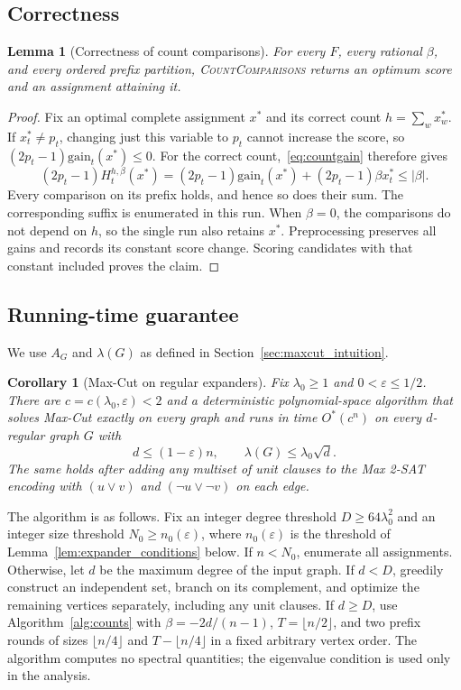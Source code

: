 \documentclass[11pt,a4paper]{article}
\newtheorem{lemma}[theorem]{Lemma}
\newtheorem{corollary}[theorem]{Corollary}
\theoremstyle{definition}
\theoremstyle{remark}
\newcommand{\Ostar}{O^{*}}
\begin{document}
\subsection{Correctness}

\begin{lemma}[Correctness of count comparisons]\label{lem:count_correctness}
For every $F$, every rational $\beta$, and every ordered prefix partition,
\textnormal{\textsc{CountComparisons}} returns an optimum score and an
assignment attaining it.
\end{lemma}
\begin{proof}
Fix an optimal complete assignment $x^*$ and its correct count
$h=\sum_wx_w^*$. If $x_t^*\ne p_t$, changing just this variable to $p_t$
cannot increase the score, so
$(2p_t-1)\mathrm{gain}_t(x^*)\le0$.
For the correct count,~\eqref{eq:countgain} therefore gives
\[
 (2p_t-1)H_t^{h,\beta}(x^*)
 =(2p_t-1)\mathrm{gain}_t(x^*)+(2p_t-1)\beta x_t^*
 \le|\beta|.
\]
Every comparison on its prefix holds, and hence so does their sum.
The corresponding suffix is enumerated in this run.
When $\beta=0$, the comparisons do not depend on $h$, so the single run
also retains $x^*$. Preprocessing preserves all gains and records its
constant score change. Scoring candidates with that constant included
proves the claim.
\end{proof}

\subsection{Running-time guarantee}\label{sec:maxcut_result}

We use $A_G$ and $\lambda(G)$ as defined in Section~\ref{sec:maxcut_intuition}.

\begin{corollary}[Max-Cut on regular expanders]\label{cor:maxcut}
Fix $\lambda_0\ge1$ and $0<\varepsilon\le1/2$. There are
$c=c(\lambda_0,\varepsilon)<2$ and a deterministic polynomial-space
algorithm that solves Max-Cut exactly on every graph and runs in time
$\Ostar(c^n)$ on every $d$-regular graph $G$ with
\[
 d\le(1-\varepsilon)n,\qquad \lambda(G)\le\lambda_0\sqrt d.
\]
The same holds after adding any multiset of unit clauses to the Max 2-SAT
encoding with $(u\lor v)$ and $(\neg u\lor\neg v)$ on each edge.
\end{corollary}

The algorithm is as follows. Fix an integer degree threshold
$D\ge64\lambda_0^2$ and an integer size threshold $N_0\ge n_0(\varepsilon)$,
where $n_0(\varepsilon)$ is the threshold of
Lemma~\ref{lem:expander_conditions} below. If $n<N_0$, enumerate all
assignments. Otherwise, let $d$ be the maximum degree of the input graph.
If $d<D$, greedily construct an independent set, branch on its complement,
and optimize the remaining vertices separately, including any unit clauses.
If $d\ge D$, use Algorithm~\ref{alg:counts} with $\beta=-2d/(n-1)$,
$T=\lfloor n/2\rfloor$, and two prefix rounds of sizes $\lfloor n/4\rfloor$
and $T-\lfloor n/4\rfloor$ in a fixed arbitrary vertex order. The algorithm
computes no spectral quantities; the eigenvalue condition is used only in
the analysis.
\end{document}
